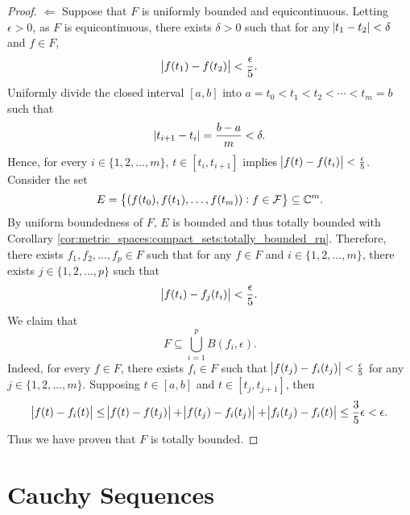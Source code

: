 \begin{proof}
$\Leftarrow$
Suppose that $F$ is uniformly bounded and equicontinuous.
Letting $\epsilon > 0$, as $F$ is equicontinuous, there exists $\delta > 0$ 
such that for any $\abs{t_1 - t_2} < \delta$ and $f \in F$, 
\begin{equation*}
    \abs{f(t_1) - f(t_2)} < \frac{\epsilon}{5}. 
\end{equation*}
Uniformly divide the closed interval $[a, b]$ into $a = t_0 < t_1 < t_2 
< \cdots < t_m = b$ such that 
\begin{equation*}
    \abs{t_{i+1} - t_i} = \frac{b - a}{m} < \delta. 
\end{equation*}
Hence, for every $i \in \{1, 2, \ldots, m\}$, $t \in [t_i, t_{i+1}]$ 
implies $\abs{f(t) - f(t_i)} < \frac{\epsilon}{5}$. 
Consider the set 
\begin{equation*}
    E = \left\{ (f(t_0), f(t_1), \ldots, f(t_m)): f \in \mathcal{F} \right\} 
    \subseteq \mathbb{C}^m. 
\end{equation*}
By uniform boundedness of $F$, $E$ is bounded and thus totally bounded with 
Corollary \ref{cor:metric_spaces:compact_sets:totally_bounded_rn}. 
Therefore, there exists $f_1, f_2, \ldots, f_p \in F$ such that for any 
$f \in F$ and $i \in \{1, 2, \ldots, m\}$, there exists $j \in \{1, 2, 
\ldots, p\}$ such that 
\begin{equation*}
    \abs{f(t_i) - f_j(t_i)} < \frac{\epsilon}{5}. 
\end{equation*} 
We claim that 
\begin{equation*}
    F \subseteq \bigcup_{i = 1}^p B(f_i, \epsilon). 
\end{equation*}
Indeed, for every $f \in F$, there exists $f_i \in F$ such that 
$\abs{f(t_j) - f_i(t_j)} < \frac{\epsilon}{5}$ for any 
$j \in \{1, 2, \ldots, m\}$. 
Supposing $t \in [a, b]$ and $t \in [t_j, t_{j+1}]$, then 
\begin{equation*}
    \begin{aligned}
        \abs{f(t) - f_i(t)} \le \abs{f(t) - f(t_j)} + \abs{f(t_j) - f_i(t_j)} 
        + \abs{f_i(t_j) - f_i(t)} \le \frac{3}{5} \epsilon < \epsilon. 
    \end{aligned}
\end{equation*}
Thus we have proven that $F$ is totally bounded. 
\end{proof}

\section{Cauchy Sequences}


